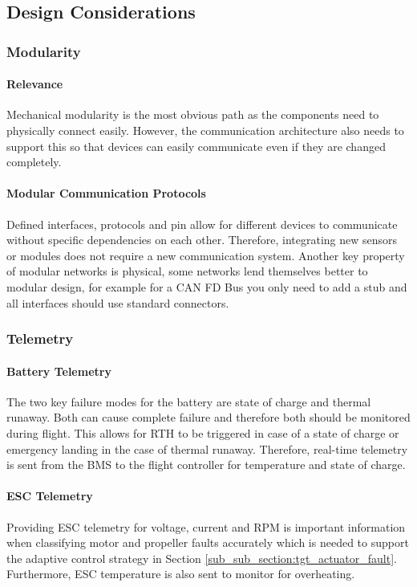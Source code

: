 \subsection{Design Considerations}\label{sub_sub_section:tgt_intra_comms_design_considerations}

\subsubsection{Modularity}\label{sub_sub_section:tgt_modularity}
\paragraph{Relevance}
Mechanical modularity is the most obvious path as the components need to physically connect easily. However, the communication architecture also needs to support this so that devices can easily communicate even if they are changed completely.
\paragraph{Modular Communication Protocols}
Defined interfaces, protocols and pin allow for different devices to communicate without specific dependencies on each other. Therefore, integrating new sensors or modules does not require a new communication system. Another key property of modular networks is physical, some networks lend themselves better to modular design, for example for a \gls{CAN} FD Bus you only need to add a stub and all interfaces should use standard connectors.

\subsubsection{Telemetry}\label{sub_sub_section:tgt_telemetry}
\paragraph{Battery Telemetry}
The two key failure modes for the battery are state of charge and thermal runaway. Both can cause complete failure and therefore both should be monitored during flight. This allows for \gls{RTH} to be triggered in case of a state of charge or emergency landing in the case of thermal runaway. Therefore, real-time telemetry is sent from the \gls{BMS} to the flight controller for temperature and state of charge.
\paragraph{\gls{ESC} Telemetry}
Providing \gls{ESC} telemetry for voltage, current and \gls{RPM} is important information when classifying motor and propeller faults accurately which is needed to support the adaptive control strategy in Section \ref{sub_sub_section:tgt_actuator_fault}. Furthermore, \gls{ESC} temperature is also sent to monitor for overheating. 

